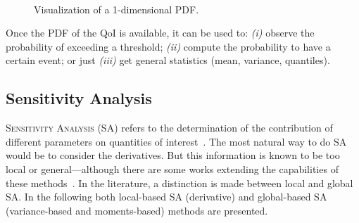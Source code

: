\begin{figure}[!ht]               
\centering
{}
 ~       
\caption{Visualization of a 1-dimensional PDF.}
\label{fig:ex_pdf}
\end{figure}

Once the PDF of the QoI is available, it can be used to: \emph{(i)} observe the probability of exceeding a threshold; \emph{(ii)} compute the probability to have a certain event; or just \emph{(iii)} get general statistics (mean, variance, quantiles).

\subsection{Sensitivity Analysis}\label{sec:sa}
\lettrine{S}{ensitivity Analysis} (SA) refers to the determination of the contribution of different parameters on quantities of interest~\cite{Saltelli2007,iooss2016}. The most natural way to do SA would be to consider the derivatives. But this information is known to be too local or general---although there are some works extending the capabilities of these methods~\cite{kucherenko2016}. In the literature, a distinction is made between local and global SA. In the following both local-based SA (derivative) and global-based SA (variance-based and moments-based) methods are presented.

